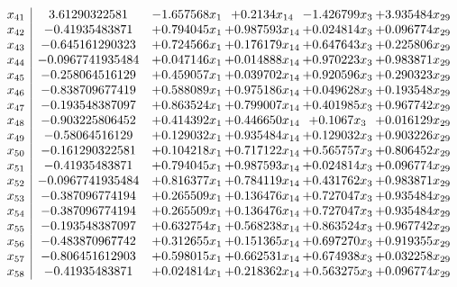 \documentclass[11pt]{article}
\begin{document}
\[\begin{array}{c| c c@{\hskip 2pt} c@{\hskip 2pt} c@{\hskip 2pt} c@{\hskip 2pt} }
 x_{41}   &  3.61290322581 & -1.657568 x_{1} & + 0.2134 x_{14} & -1.426799 x_{3} & + 3.935484 x_{29}\\
 x_{42}   &  -0.41935483871 & + 0.794045 x_{1} & + 0.987593 x_{14} & + 0.024814 x_{3} & + 0.096774 x_{29}\\
 x_{43}   &  -0.645161290323 & + 0.724566 x_{1} & + 0.176179 x_{14} & + 0.647643 x_{3} & + 0.225806 x_{29}\\
 x_{44}   &  -0.0967741935484 & + 0.047146 x_{1} & + 0.014888 x_{14} & + 0.970223 x_{3} & + 0.983871 x_{29}\\
 x_{45}   &  -0.258064516129 & + 0.459057 x_{1} & + 0.039702 x_{14} & + 0.920596 x_{3} & + 0.290323 x_{29}\\
 x_{46}   &  -0.838709677419 & + 0.588089 x_{1} & + 0.975186 x_{14} & + 0.049628 x_{3} & + 0.193548 x_{29}\\
 x_{47}   &  -0.193548387097 & + 0.863524 x_{1} & + 0.799007 x_{14} & + 0.401985 x_{3} & + 0.967742 x_{29}\\
 x_{48}   &  -0.903225806452 & + 0.414392 x_{1} & + 0.446650 x_{14} & + 0.1067 x_{3} & + 0.016129 x_{29}\\
 x_{49}   &  -0.58064516129 & + 0.129032 x_{1} & + 0.935484 x_{14} & + 0.129032 x_{3} & + 0.903226 x_{29}\\
 x_{50}   &  -0.161290322581 & + 0.104218 x_{1} & + 0.717122 x_{14} & + 0.565757 x_{3} & + 0.806452 x_{29}\\
 x_{51}   &  -0.41935483871 & + 0.794045 x_{1} & + 0.987593 x_{14} & + 0.024814 x_{3} & + 0.096774 x_{29}\\
 x_{52}   &  -0.0967741935484 & + 0.816377 x_{1} & + 0.784119 x_{14} & + 0.431762 x_{3} & + 0.983871 x_{29}\\
 x_{53}   &  -0.387096774194 & + 0.265509 x_{1} & + 0.136476 x_{14} & + 0.727047 x_{3} & + 0.935484 x_{29}\\
 x_{54}   &  -0.387096774194 & + 0.265509 x_{1} & + 0.136476 x_{14} & + 0.727047 x_{3} & + 0.935484 x_{29}\\
 x_{55}   &  -0.193548387097 & + 0.632754 x_{1} & + 0.568238 x_{14} & + 0.863524 x_{3} & + 0.967742 x_{29}\\
 x_{56}   &  -0.483870967742 & + 0.312655 x_{1} & + 0.151365 x_{14} & + 0.697270 x_{3} & + 0.919355 x_{29}\\
 x_{57}   &  -0.806451612903 & + 0.598015 x_{1} & + 0.662531 x_{14} & + 0.674938 x_{3} & + 0.032258 x_{29}\\
 x_{58}   &  -0.41935483871 & + 0.024814 x_{1} & + 0.218362 x_{14} & + 0.563275 x_{3} & + 0.096774 x_{29}\\

\end{array}\]
\end{document}
